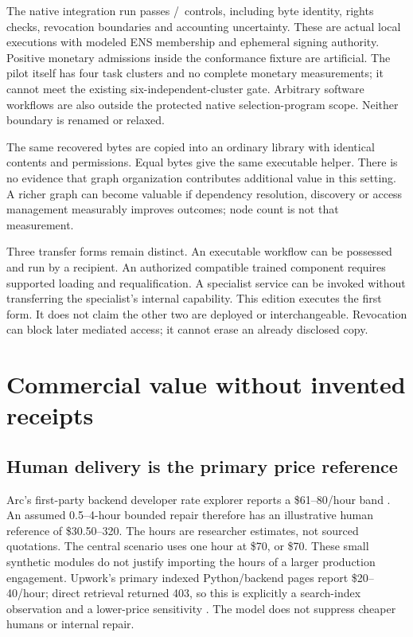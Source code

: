 \documentclass[11pt,letterpaper]{article}
\begin{document}
The native integration run passes \NativePassed/\NativeTotal\ controls, including byte identity, rights checks, revocation boundaries and accounting uncertainty. These are actual local executions with modeled ENS membership and ephemeral signing authority. Positive monetary admissions inside the conformance fixture are artificial. The pilot itself has four task clusters and no complete monetary measurements; it cannot meet the existing six-independent-cluster gate. Arbitrary software workflows are also outside the protected native selection-program scope. Neither boundary is renamed or relaxed.

The same recovered bytes are copied into an ordinary library with identical contents and permissions. Equal bytes give the same executable helper. There is no evidence that graph organization contributes additional value in this setting. A richer graph can become valuable if dependency resolution, discovery or access management measurably improves outcomes; node count is not that measurement.

Three transfer forms remain distinct. An executable workflow can be possessed and run by a recipient. An authorized compatible trained component requires supported loading and requalification. A specialist service can be invoked without transferring the specialist's internal capability. This edition executes the first form. It does not claim the other two are deployed or interchangeable. Revocation can block later mediated access; it cannot erase an already disclosed copy.

\section{Commercial value without invented receipts}
\subsection{Human delivery is the primary price reference}
Arc's first-party backend developer rate explorer reports a \$61--80/hour band \cite{arc}. An assumed 0.5--4-hour bounded repair therefore has an illustrative human reference of \$30.50--320. The hours are researcher estimates, not sourced quotations. The central scenario uses one hour at \$70, or \$70. These small synthetic modules do not justify importing the hours of a larger production engagement. Upwork's primary indexed Python/backend pages report \$20--40/hour; direct retrieval returned 403, so this is explicitly a search-index observation and a lower-price sensitivity \cite{upwork}. The model does not suppress cheaper humans or internal repair.
\end{document}
